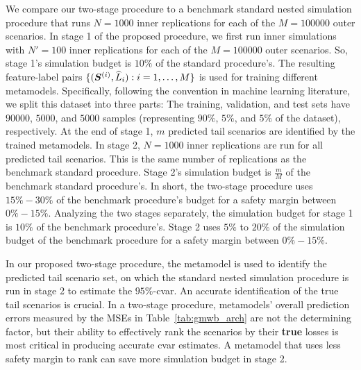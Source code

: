 We compare our two-stage procedure to a benchmark standard nested simulation procedure that runs $N=\num{1000}$ inner replications for each of the $M=\num{100000}$ outer scenarios.
In stage 1 of the proposed procedure, we first run inner simulations with $N'=100$ inner replications for each of the $M=\num{100000}$ outer scenarios.
So, stage 1's simulation budget is $10\%$ of the standard procedure's.
The resulting feature-label pairs $\{(\bm{S}^{(i)}, \widehat{L}_i): i=1,\ldots,M\}$ is used for training different  metamodels.
Specifically, following the convention in machine learning literature, we split this dataset into three parts: The training, validation, and test sets have $\num{90000}$, $\num{5000}$, and $\num{5000}$ samples (representing $90\%$, $5\%$, and $5\%$ of the dataset), respectively.
At the end of stage 1, $m$ predicted tail scenarios are identified by the trained metamodels.
In stage 2, $N=\num{1000}$ inner replications are run for all predicted tail scenarios.
This is the same number of replications as the benchmark standard procedure.
Stage 2's simulation budget is $\frac{m}{M}$ of the benchmark standard procedure's.
In short, the two-stage procedure uses $15\% - 30\%$ of the benchmark procedure's budget for a safety margin between $0\% - 15\%$.
Analyzing the two stages separately, the simulation budget for stage 1 is $10\%$ of the benchmark procedure's.
Stage 2 uses $5\%$ to $20\%$ of the simulation budget of the benchmark procedure for a safety margin between $0\% - 15\%$.

In our proposed two-stage procedure, the metamodel is used to identify the predicted tail scenario set, on which the standard nested simulation procedure is run in stage 2 to estimate the $95\%$-\gls{cvar}.
An accurate identification of the true tail scenarios is crucial.
In a two-stage procedure, metamodels' overall prediction errors measured by the MSEs in Table~\ref{tab:gmwb_arch} are not the determining factor, but their ability to effectively rank the scenarios by their \textbf{true} losses is most critical in producing accurate \gls{cvar} estimates. 
A metamodel that uses less safety margin to rank can save more simulation budget in stage 2.

